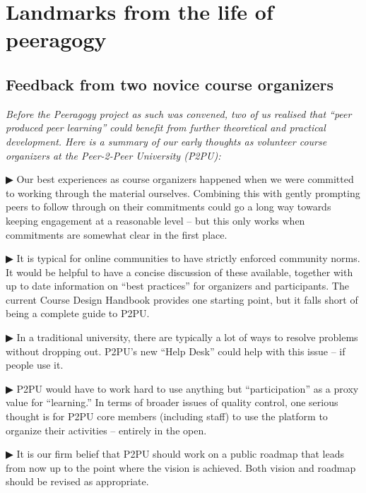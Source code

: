 \section*{Landmarks from the life of peeragogy}

\begin{mdframed}
\subsection{Feedback from two novice course organizers}

\noindent \emph{Before the Peeragogy project as such was convened, two
  of us realised that ``peer produced peer learning'' could benefit
  from further theoretical and practical development.  Here is a
  summary of our early thoughts as volunteer course organizers at the
  Peer-2-Peer University (P2PU):}

▶ Our best experiences as course organizers happened when we were committed to working through the material ourselves. Combining this with gently prompting peers to follow through on their commitments could go a long way towards keeping engagement at a reasonable level – but this only works when commitments are somewhat clear in the first place. 

▶ It is typical for online communities to have strictly enforced community norms. It would be helpful to have a concise discussion of these available, together with up to date information on “best practices” for organizers and participants. The current Course Design Handbook provides one starting point, but it falls short of being a complete guide to P2PU.

▶ In a traditional university, there are typically a lot of ways to resolve problems without dropping out. P2PU’s new “Help Desk” could help with this issue -- if people use it.

▶ P2PU would have to work hard to use anything but “participation” as a proxy value for ``learning.'' In terms of broader issues of quality control, one serious thought is for P2PU core members (including staff) to use the platform to organize their activities – entirely in the open.

▶ It is our firm belief that P2PU should work on a public roadmap that leads from now up to the point where the vision is achieved. Both vision and roadmap should be revised as appropriate.
\end{mdframed}


